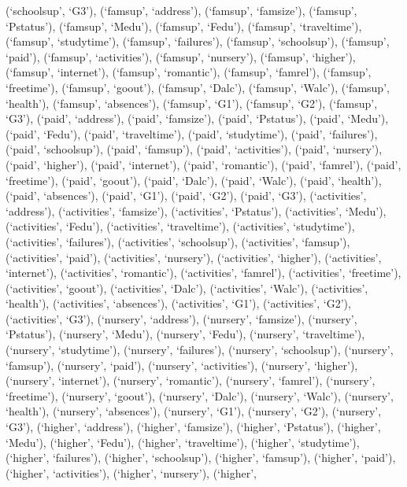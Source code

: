 \documentclass[
]{article}
\begin{document}
(`schoolsup', `G3'), (`famsup', `address'), (`famsup', `famsize'),
(`famsup', `Pstatus'), (`famsup', `Medu'), (`famsup', `Fedu'),
(`famsup', `traveltime'), (`famsup', `studytime'), (`famsup',
`failures'), (`famsup', `schoolsup'), (`famsup', `paid'), (`famsup',
`activities'), (`famsup', `nursery'), (`famsup', `higher'), (`famsup',
`internet'), (`famsup', `romantic'), (`famsup', `famrel'), (`famsup',
`freetime'), (`famsup', `goout'), (`famsup', `Dalc'), (`famsup',
`Walc'), (`famsup', `health'), (`famsup', `absences'), (`famsup', `G1'),
(`famsup', `G2'), (`famsup', `G3'), (`paid', `address'), (`paid',
`famsize'), (`paid', `Pstatus'), (`paid', `Medu'), (`paid', `Fedu'),
(`paid', `traveltime'), (`paid', `studytime'), (`paid', `failures'),
(`paid', `schoolsup'), (`paid', `famsup'), (`paid', `activities'),
(`paid', `nursery'), (`paid', `higher'), (`paid', `internet'), (`paid',
`romantic'), (`paid', `famrel'), (`paid', `freetime'), (`paid',
`goout'), (`paid', `Dalc'), (`paid', `Walc'), (`paid', `health'),
(`paid', `absences'), (`paid', `G1'), (`paid', `G2'), (`paid', `G3'),
(`activities', `address'), (`activities', `famsize'), (`activities',
`Pstatus'), (`activities', `Medu'), (`activities', `Fedu'),
(`activities', `traveltime'), (`activities', `studytime'),
(`activities', `failures'), (`activities', `schoolsup'), (`activities',
`famsup'), (`activities', `paid'), (`activities', `nursery'),
(`activities', `higher'), (`activities', `internet'), (`activities',
`romantic'), (`activities', `famrel'), (`activities', `freetime'),
(`activities', `goout'), (`activities', `Dalc'), (`activities', `Walc'),
(`activities', `health'), (`activities', `absences'), (`activities',
`G1'), (`activities', `G2'), (`activities', `G3'), (`nursery',
`address'), (`nursery', `famsize'), (`nursery', `Pstatus'), (`nursery',
`Medu'), (`nursery', `Fedu'), (`nursery', `traveltime'), (`nursery',
`studytime'), (`nursery', `failures'), (`nursery', `schoolsup'),
(`nursery', `famsup'), (`nursery', `paid'), (`nursery', `activities'),
(`nursery', `higher'), (`nursery', `internet'), (`nursery', `romantic'),
(`nursery', `famrel'), (`nursery', `freetime'), (`nursery', `goout'),
(`nursery', `Dalc'), (`nursery', `Walc'), (`nursery', `health'),
(`nursery', `absences'), (`nursery', `G1'), (`nursery', `G2'),
(`nursery', `G3'), (`higher', `address'), (`higher', `famsize'),
(`higher', `Pstatus'), (`higher', `Medu'), (`higher', `Fedu'),
(`higher', `traveltime'), (`higher', `studytime'), (`higher',
`failures'), (`higher', `schoolsup'), (`higher', `famsup'), (`higher',
`paid'), (`higher', `activities'), (`higher', `nursery'), (`higher',
\end{document}
